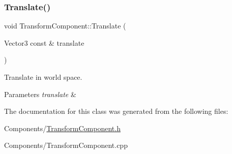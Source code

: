 \subsubsection{\texorpdfstring{Translate()}{Translate()}\hspace{0.1cm}{\footnotesize\ttfamily [2/2]}}
{\footnotesize\ttfamily void Transform\+Component\+::\+Translate (\begin{DoxyParamCaption}\item[{Vector3 const \&}]{translate }\end{DoxyParamCaption})}



Translate in world space. 


\begin{DoxyParams}{Parameters}
{\em translate} & \\
\hline
\end{DoxyParams}


The documentation for this class was generated from the following files\+:\begin{DoxyCompactItemize}
\item 
Components/\hyperlink{TransformComponent_8h}{Transform\+Component.\+h}\item 
Components/Transform\+Component.\+cpp\end{DoxyCompactItemize}
